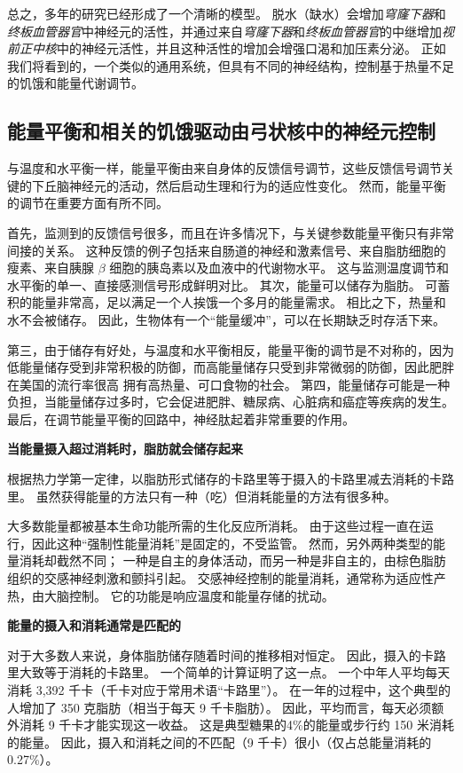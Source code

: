 总之，多年的研究已经形成了一个清晰的模型。
脱水（缺水）会增加\textit{穹窿下器}和\textit{终板血管器官}中神经元的活性，并通过来自\textit{穹窿下器}和\textit{终板血管器官}的中继增加\textit{视前正中核}中的神经元活性，并且这种活性的增加会增强口渴和加压素分泌。
正如我们将看到的，一个类似的通用系统，但具有不同的神经结构，控制基于热量不足的饥饿和能量代谢调节。



\subsection{能量平衡和相关的饥饿驱动由弓状核中的神经元控制}

与温度和水平衡一样，能量平衡由来自身体的反馈信号调节，这些反馈信号调节关键的下丘脑神经元的活动，然后启动生理和行为的适应性变化。
然而，能量平衡的调节在重要方面有所不同。


首先，监测到的反馈信号很多，而且在许多情况下，与关键参数能量平衡只有非常间接的关系。
这种反馈的例子包括来自肠道的神经和激素信号、来自脂肪细胞的瘦素、来自胰腺 $ \beta $ 细胞的胰岛素以及血液中的代谢物水平。
这与监测温度调节和水平衡的单一、直接感测信号形成鲜明对比。
其次，能量可以储存为脂肪。
可蓄积的能量非常高，足以满足一个人挨饿一个多月的能量需求。 相比之下，热量和水不会被储存。
因此，生物体有一个“能量缓冲”，可以在长期缺乏时存活下来。


第三，由于储存有好处，与温度和水平衡相反，能量平衡的调节是不对称的，因为低能量储存受到非常积极的防御，而高能量储存只受到非常微弱的防御，因此肥胖在美国的流行率很高 拥有高热量、可口食物的社会。
第四，能量储存可能是一种负担，当能量储存过多时，它会促进肥胖、糖尿病、心脏病和癌症等疾病的发生。
最后，在调节能量平衡的回路中，神经肽起着非常重要的作用。


\textbf{当能量摄入超过消耗时，脂肪就会储存起来}

根据热力学第一定律，以脂肪形式储存的卡路里等于摄入的卡路里减去消耗的卡路里。
虽然获得能量的方法只有一种（吃）但消耗能量的方法有很多种。


大多数能量都被基本生命功能所需的生化反应所消耗。
由于这些过程一直在运行，因此这种“强制性能量消耗”是固定的，不受监管。
然而，另外两种类型的能量消耗却截然不同；
一种是自主的身体活动，而另一种是非自主的，由棕色脂肪组织的交感神经刺激和颤抖引起。
交感神经控制的能量消耗，通常称为适应性产热，由大脑控制。
它的功能是响应温度和能量存储的扰动。


\textbf{能量的摄入和消耗通常是匹配的}

对于大多数人来说，身体脂肪储存随着时间的推移相对恒定。
因此，摄入的卡路里大致等于消耗的卡路里。 一个简单的计算证明了这一点。
一个中年人平均每天消耗 3,392 千卡（千卡对应于常用术语“卡路里”）。
在一年的过程中，这个典型的人增加了 350 克脂肪（相当于每天 9 千卡脂肪）。
因此，平均而言，每天必须额外消耗 9 千卡才能实现这一收益。
这是典型糖果的4\%的能量或步行约 150 米消耗的能量。
因此，摄入和消耗之间的不匹配（9 千卡）很小（仅占总能量消耗的 0.27\%）。


